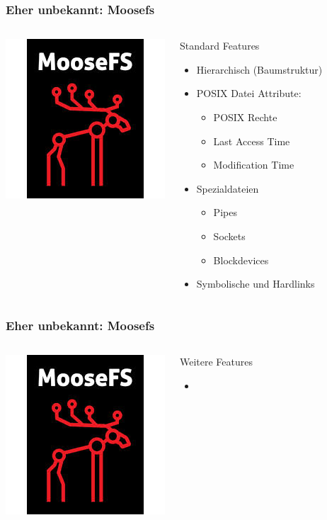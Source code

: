 \documentclass{beamer}
\begin{document}
\begin{frame}
	\frametitle{Eher unbekannt: Moosefs}
	\begin{columns}	
	\includegraphics[scale=0.5]{moosefs.jpg}
	\begin{block}{Standard Features}
		\begin{itemize}
			\item Hierarchisch (Baumstruktur)
			\item POSIX Datei Attribute:
			\begin{itemize}
				\item POSIX Rechte
				\item Last Access Time
				\item Modification Time 
			\end{itemize}	
			\item Spezialdateien
			\begin{itemize}
				\item Pipes
				\item Sockets
				\item Blockdevices
			\end{itemize}
			\item Symbolische und Hardlinks
		\end{itemize}
	\end{block}	
	\end{columns}
\end{frame}

\begin{frame}
	\frametitle{Eher unbekannt: Moosefs}
	\begin{columns}	
	\column{.45\textwidth}
	\includegraphics[scale=0.5]{moosefs.jpg}
	\column{.55\textwidth}
	\begin{block}{Weitere Features}
		\begin{itemize}
			\item 
		\end{itemize}
	\end{block}	
	\end{columns}
\end{frame}
\end{document}
